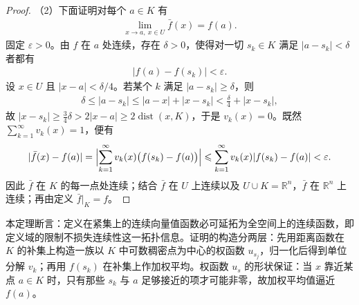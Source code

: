 \documentclass[../../main.tex]{subfiles}%
\begin{document}
\begin{proof}
（2）下面证明对每个 $a\in K$ 有
\begin{align*}
\lim_{x\to a,\ x\in U}\bar f(x)=f(a).
\end{align*}
固定 $\varepsilon>0$。由 $f$ 在 $a$ 处连续，存在 $\delta>0$，使得对一切 $s_k\in K$ 满足 $\lvert a-s_k\rvert<\delta$ 者都有
\begin{align*}
\lvert f(a)-f(s_k)\rvert<\varepsilon.
\end{align*}
设 $x\in U$ 且 $\lvert x-a\rvert<\delta/4$。若某个 $k$ 满足 $\lvert a-s_k\rvert\geqslant\delta$，则
\begin{align*}
\delta\leqslant\lvert a-s_k\rvert\leqslant\lvert a-x\rvert+\lvert x-s_k\rvert<\frac{\delta}{4}+\lvert x-s_k\rvert,
\end{align*}
故 $\lvert x-s_k\rvert\geqslant\frac{3}{4}\delta>2\lvert x-a\rvert\geqslant2\operatorname{dist}(x,K)$，于是 $v_k(x)=0$。既然 $\sum_{k=1}^{\infty}v_k(x)=1$，便有
\begin{align*}
\lvert\bar f(x)-f(a)\rvert
=\Bigl\lvert\sum_{k=1}^{\infty}v_k(x)\bigl(f(s_k)-f(a)\bigr)\Bigr\rvert
\leqslant\sum_{k=1}^{\infty}v_k(x)\lvert f(s_k)-f(a)\rvert<\varepsilon.
\end{align*}
因此 $\bar f$ 在 $K$ 的每一点处连续；结合 $\bar f$ 在 $U$ 上连续以及 $U\cup K=\mathbb{R}^n$，$\bar f$ 在 $\mathbb{R}^n$ 上连续；再由定义 $\bar f|_K=f$。
\end{proof}

\begin{remark}\label{remark:ch01-thm-1-13-动机}
本定理断言：定义在紧集上的连续向量值函数必可延拓为全空间上的连续函数，即定义域的限制不损失连续性这一拓扑信息。证明的构造分两层：先用距离函数在 $K$ 的补集上构造一族以 $K$ 中可数稠密点为中心的权函数 $u_{s_j}$，归一化后得到单位分解 $v_k$；再用 $f(s_k)$ 在补集上作加权平均。权函数 $u_s$ 的形状保证：当 $x$ 靠近某点 $a\in K$ 时，只有那些 $s_k$ 与 $a$ 足够接近的项才可能非零，故加权平均值逼近 $f(a)$。
\end{remark}
\end{document}
